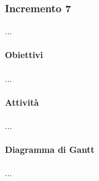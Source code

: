 \subsubsection{Incremento 7}
...
\paragraph{Obiettivi}
...
\paragraph{Attività}
...
\paragraph{Diagramma di Gantt}
...

